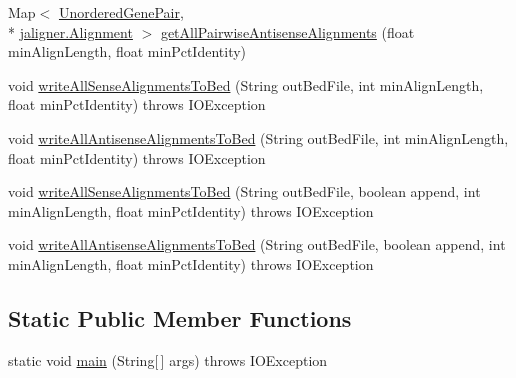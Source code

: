 \begin{DoxyCompactItemize}
\item 
Map$<$ \hyperlink{classumms_1_1core_1_1alignment_1_1_feature_sequence_alignment_1_1_unordered_gene_pair}{Unordered\+Gene\+Pair}, \\*
\hyperlink{classjaligner_1_1_alignment}{jaligner.\+Alignment} $>$ \hyperlink{classumms_1_1core_1_1alignment_1_1_feature_sequence_alignment_ab6151110c36c6f03905a49d791fd56f1}{get\+All\+Pairwise\+Antisense\+Alignments} (float min\+Align\+Length, float min\+Pct\+Identity)
\item 
void \hyperlink{classumms_1_1core_1_1alignment_1_1_feature_sequence_alignment_a61e3263283cf027e28d2b280b53aa5ea}{write\+All\+Sense\+Alignments\+To\+Bed} (String out\+Bed\+File, int min\+Align\+Length, float min\+Pct\+Identity)  throws I\+O\+Exception 
\item 
void \hyperlink{classumms_1_1core_1_1alignment_1_1_feature_sequence_alignment_adfc91ae05ecb83e8d09963f5ffe8e2ea}{write\+All\+Antisense\+Alignments\+To\+Bed} (String out\+Bed\+File, int min\+Align\+Length, float min\+Pct\+Identity)  throws I\+O\+Exception 
\item 
void \hyperlink{classumms_1_1core_1_1alignment_1_1_feature_sequence_alignment_af19b7baf1e78ec683d89359f06fc4327}{write\+All\+Sense\+Alignments\+To\+Bed} (String out\+Bed\+File, boolean append, int min\+Align\+Length, float min\+Pct\+Identity)  throws I\+O\+Exception 
\item 
void \hyperlink{classumms_1_1core_1_1alignment_1_1_feature_sequence_alignment_aec99809f0d839cd75596dd97f5f33305}{write\+All\+Antisense\+Alignments\+To\+Bed} (String out\+Bed\+File, boolean append, int min\+Align\+Length, float min\+Pct\+Identity)  throws I\+O\+Exception 
\end{DoxyCompactItemize}
\subsection*{Static Public Member Functions}
\begin{DoxyCompactItemize}
\item 
static void \hyperlink{classumms_1_1core_1_1alignment_1_1_feature_sequence_alignment_a09afca590c8f7c9a6adcb2289b911fa5}{main} (String\mbox{[}$\,$\mbox{]} args)  throws I\+O\+Exception 
\end{DoxyCompactItemize}
